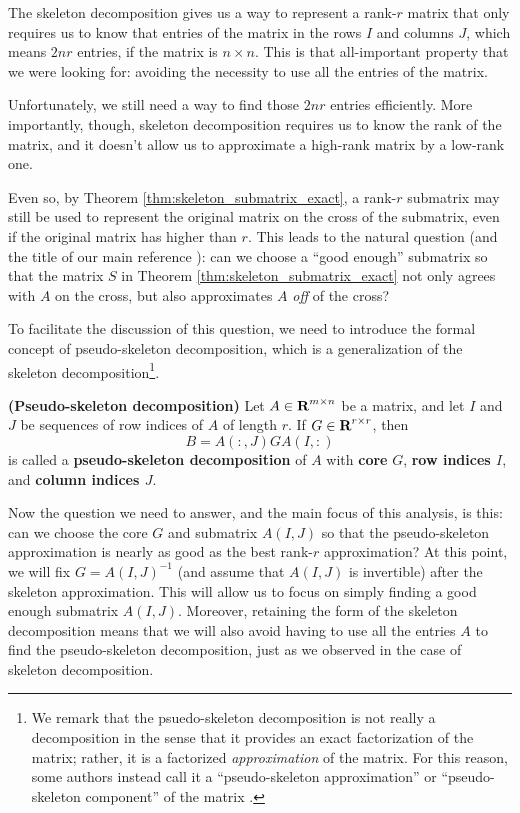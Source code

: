 \documentclass{article}
\begin{document}
	
	
	The skeleton decomposition gives us a way to represent a rank-$r$ matrix that only requires us to know that entries of the matrix in the rows $I$ and columns $J$, which means $2nr$ entries, if the matrix is $n\times n$. This is that all-important property that we were looking for: avoiding the necessity to use all the entries of the matrix.
	
	Unfortunately, we still need a way to find those $2nr$ entries efficiently. More importantly, though, skeleton decomposition requires us to know the rank of the matrix, and it doesn't allow us to approximate a high-rank matrix by a low-rank one.
	
	Even so, by Theorem \ref{thm:skeleton_submatrix_exact}, a rank-$r$ submatrix may still be used to represent the original matrix on the cross of the submatrix, even if the original matrix has higher than $r$. This leads to the natural question (and the title of our main reference \cite{goreinov_2010}): can we choose a ``good enough'' submatrix so that the matrix $S$ in Theorem \ref{thm:skeleton_submatrix_exact} not only agrees with $A$ on the cross, but also approximates $A$ \textit{off} of the cross?
	
	To facilitate the discussion of this question, we need to introduce the formal concept of pseudo-skeleton decomposition, which is a generalization of the skeleton decomposition\footnote{We remark that the psuedo-skeleton decomposition is not really a decomposition in the sense that it provides an exact factorization of the matrix; rather, it is a factorized \textit{approximation} of the matrix. For this reason, some authors instead call it a ``pseudo-skeleton approximation'' or ``pseudo-skeleton component'' of the matrix \cite{goreinov_1997, oseledets_2010a}.}.
	
	\begin{dfn} \textnormal{\bf(Pseudo-skeleton decomposition)}
		Let $A \in \textnormal{\bf R}^{m\times n}$ be a matrix, and let $I$ and $J$ be sequences of row indices of $A$ of length $r$. If $G \in \textnormal{\bf R}^{r\times r}$, then
		\begin{equation}
			B = A(:, J) G A(I,:)
		\end{equation}
		is called a \textbf{pseudo-skeleton decomposition} of $A$ with \textbf{core} $G$, \textbf{row indices $I$}, and \textbf{column indices $J$}.
	\end{dfn}
	
	Now the question we need to answer, and the main focus of this analysis, is this: can we choose the core $G$ and submatrix $A(I,J)$ so that the pseudo-skeleton approximation is nearly as good as the best rank-$r$ approximation? At this point, we will fix $G = A(I,J)^{-1}$ (and assume that $A(I,J)$ is invertible) after the skeleton approximation. This will allow us to focus on simply finding a good enough submatrix $A(I,J)$. Moreover, retaining the form of the skeleton decomposition means that we will also avoid having to use all the entries $A$ to find the pseudo-skeleton decomposition, just as we observed in the case of skeleton decomposition.
	
\end{document}
